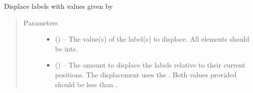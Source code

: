 \documentclass[letterpaper,10pt,english]{sphinxmanual}
\begin{document}
\begin{fulllineitems}
\begin{sphinxVerbatim}[commandchars=\\\{\}]
 
\end{sphinxVerbatim}

\begin{fulllineitems}
\label{\detokenize{references/plot:nmrespy.plot.NmrespyPlot.displace_labels}}
\sphinxAtStartPar
Displace labels with values given by 
\begin{quote}\begin{description}
\item[{Parameters}] \leavevmode\begin{itemize}
\item {} 
\sphinxAtStartPar
{} () – The value(s) of the label(s) to displace. All elements should be
ints.

\item {} 
\sphinxAtStartPar
{} (\sphinxstyleliteralemphasis{\sphinxupquote{(}}\sphinxstyleliteralemphasis{\sphinxupquote{, }}\sphinxstyleliteralemphasis{\sphinxupquote{)}}) – The amount to displace the labels relative to their current
positions. The displacement uses the
.
Both values provided should be less than .

\end{itemize}

\end{description}\end{quote}

\end{fulllineitems}


\end{fulllineitems}
\end{document}

